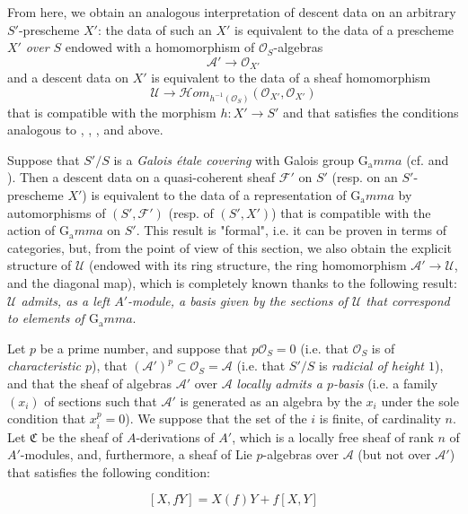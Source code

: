 From here, we obtain an analogous interpretation of descent data on an arbitrary $S'$-prescheme $X'$:
the data of such an $X'$ is equivalent to the data of a prescheme $X'$ \emph{over $S$} endowed with a homomorphism of $\mathcal{O}_S$-algebras
\[
    \mathcal{A}'\to\mathcal{O}_{X'}
\]
and a descent data on $X'$ is equivalent to the data of a sheaf homomorphism
\[
    \mathcal{U}
    \to \mathcal{H}om_{h^{-1}(\mathcal{O}_S)}(\mathcal{O}_{X'},\mathcal{O}_{X'})
\]
that is compatible with the morphism $h\colon X'\to S'$ and that satisfies the conditions analogous to , , , and  above.

\begin{example}\label{fga3.i-b.3-example-1}
    Suppose that $S'/S$ is a \emph{Galois étale covering} with Galois group $\operatorname{G_a}mma$ (cf.  and ).
    Then a descent data on a quasi-coherent sheaf $\mathcal{F}'$ on $S'$ (resp. on an $S'$-prescheme $X'$) is equivalent to the data of a representation of $\operatorname{G_a}mma$ by automorphisms of $(S',\mathcal{F}')$ (resp. of $(S',X')$) that is compatible with the action of $\operatorname{G_a}mma$ on $S'$.
    This result is "formal", i.e. it can be proven in terms of categories, but, from the point of view of this section, we also obtain the explicit structure of $\mathcal{U}$ (endowed with its ring structure, the ring homomorphism $\mathcal{A}'\to\mathcal{U}$, and the diagonal map), which is completely known thanks to the following result:
    \emph{$\mathcal{U}$ admits, as a left $A'$-module, a basis given by the sections of $\mathcal{U}$ that correspond to elements of $\operatorname{G_a}mma$}.
\end{example}

\begin{example}\label{fga3.i-b.3-example-2}
    Let $p$ be a prime number, and suppose that $p\mathcal{O}_S=0$ (i.e. that $\mathcal{O}_S$ is of \emph{characteristic $p$}), that $(\mathcal{A}')^p\subset\mathcal{O}_S=\mathcal{A}$ (i.e. that $S'/S$ is \emph{radicial of height $1$}), and that the sheaf of algebras $\mathcal{A}'$ over $\mathcal{A}$ \emph{locally admits a $p$-basis} (i.e. a family $(x_i)$ of sections such that $\mathcal{A}'$ is generated as an algebra by the $x_i$ under the sole condition that $x_i^p=0$).
    We suppose that the set of the $i$ is finite, of cardinality $n$.
    Let $\mathfrak{C}$ be the sheaf of $A$-derivations of $A'$, which is a locally free sheaf of rank $n$ of $A'$-modules, and, furthermore, a sheaf of Lie $p$-algebras over $\mathcal{A}$ (but not over $\mathcal{A}'$) that satisfies the following condition:

    \begin{equation}\tag{3.5}\label{fga3.i-b.3-equation-3.5}
        [X,fY] = X(f)Y + f[X,Y]
    \end{equation}
\end{example}

